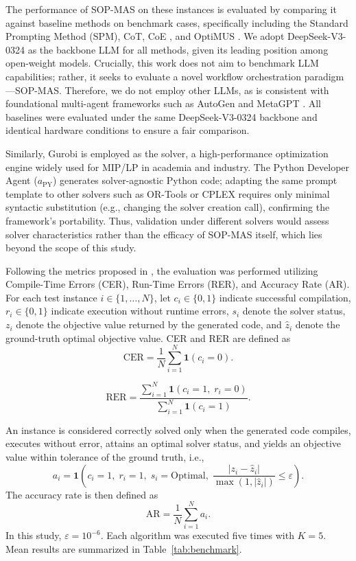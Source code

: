 \documentclass[preprint,12pt]{elsarticle}
\begin{document}
The performance of SOP-MAS on these instances is evaluated by comparing it against baseline methods on benchmark cases, specifically including the Standard Prompting Method (SPM), CoT, CoE \citep{xiaoChainofExpertsWhenLLMs2023}, and OptiMUS \citep{ahmaditeshniziOptiMUSScalableOptimization2024b}. We adopt DeepSeek-V3-0324 as the backbone LLM for all methods, given its leading position among open-weight models. Crucially, this work does not aim to benchmark LLM capabilities; rather, it seeks to evaluate a novel workflow orchestration paradigm—SOP-MAS. Therefore, we do not employ other LLMs, as is consistent with foundational multi-agent frameworks such as AutoGen \citep{wuAutoGenEnablingNextGen2024} and MetaGPT \citep{hongMetaGPTMetaProgramming2023a}. All baselines were evaluated under the same DeepSeek-V3-0324 backbone and identical hardware conditions to ensure a fair comparison.

Similarly, Gurobi is employed as the solver, a high-performance optimization engine widely used for MIP/LP in academia and industry. The Python Developer Agent ($a_{\text{PY}}$) generates solver-agnostic Python code; adapting the same prompt template to other solvers such as OR-Tools or CPLEX requires only minimal syntactic substitution (e.g., changing the solver creation call), confirming the framework's portability. Thus, validation under different solvers would assess solver characteristics rather than the efficacy of SOP-MAS itself, which lies beyond the scope of this study.

Following the metrics proposed in \citet{xiaoChainofExpertsWhenLLMs2023}, the evaluation was performed utilizing Compile-Time Errors (CER), Run-Time Errors (RER), and Accuracy Rate (AR). For each test instance $i \in \{1,\dots,N\}$, let $c_i \in \{0,1\}$ indicate successful compilation, $r_i \in \{0,1\}$ indicate execution without runtime errors, $s_i$ denote the solver status, $z_i$ denote the objective value returned by the generated code, and $\hat z_i$ denote the ground-truth optimal objective value. CER and RER are defined as
\begin{equation}
\mathrm{CER}=\frac{1}{N}\sum_{i=1}^{N}\mathbf{1}(c_i=0).
\end{equation}


\begin{equation}
 \mathrm{RER}=\frac{\sum_{i=1}^{N}\mathbf{1}(c_i=1,\; r_i=0)}{\sum_{i=1}^{N}\mathbf{1}(c_i=1)}. 
\end{equation}

An instance is considered correctly solved only when the generated code compiles, executes without error, attains an optimal solver status, and yields an objective value within tolerance of the ground truth, i.e.,
\begin{equation}
a_i=\mathbf{1}\!\left(c_i=1,\; r_i=1,\; s_i=\mathrm{Optimal},\; \frac{|z_i-\hat z_i|}{\max(1,|\hat z_i|)}\le \varepsilon\right).
\end{equation}
The accuracy rate is then defined as
\begin{equation}
\mathrm{AR}=\frac{1}{N}\sum_{i=1}^{N} a_i.
\end{equation}
In this study, $\varepsilon = 10^{-6}$. Each algorithm was executed five times with $K=5$. Mean results are summarized in Table~\ref{tab:benchmark}.
\end{document}
